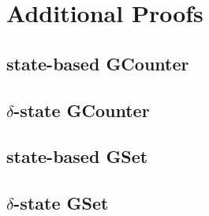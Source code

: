 \chapter{Additional Proofs}

\TODO

\section{state-based GCounter \CRDT}

\begin{figure}[H]

\end{figure}

\begin{figure}[H]

\end{figure}

\section{$\delta$-state GCounter \CRDT}

\begin{figure}[H]

\end{figure}

\section{state-based GSet \CRDT}

\begin{figure}[H]

\end{figure}

\section{$\delta$-state GSet \CRDT}

\begin{figure}[H]

\end{figure}
